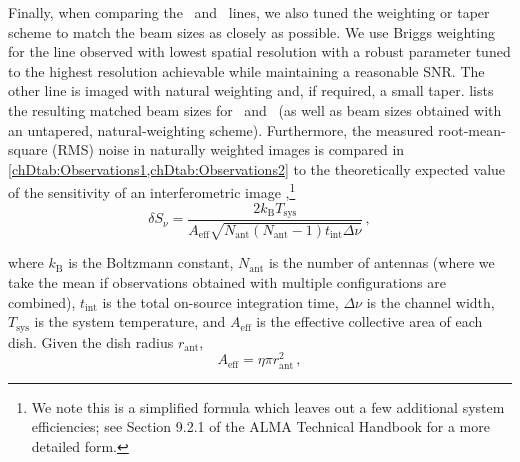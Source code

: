 Finally, when comparing the \CII\ and \OIIIf\ lines, we also tuned the weighting or taper scheme to match the beam sizes as closely as possible. We use Briggs weighting for the line observed with lowest spatial resolution with a robust parameter tuned to the highest resolution achievable while maintaining a reasonable SNR. The other line is imaged with natural weighting and, if required, a small taper.  lists the resulting matched beam sizes for \CII\ and \OIIIf\ (as well as beam sizes obtained with an untapered, natural-weighting scheme). Furthermore, the measured root-mean-square (RMS) noise in naturally weighted images is compared in \cref{chDtab:Observations1,chDtab:Observations2} to the theoretically expected value of the sensitivity of an interferometric image \citep{2017isra.book.....T},\footnote{We note this is a simplified formula which leaves out a few additional system efficiencies; see Section 9.2.1 of the ALMA Technical Handbook \citep{ALMA_technical_handbook} for a more detailed form.}
\begin{equation}
    \label{chDeq:Interferometry_sensitivity}
    \delta S_\nu = \frac{2 k_\text{B} T_\text{sys}}{A_\text{eff} \sqrt{N_\text{ant} (N_\text{ant} - 1) t_\text{int} \Delta \nu}} \, ,
\end{equation}

\noindent where $k_\text{B}$ is the Boltzmann constant, $N_\text{ant}$ is the number of antennas (where we take the mean if observations obtained with multiple configurations are combined), $t_\text{int}$ is the total on-source integration time, $\Delta \nu$ is the channel width, $T_\text{sys}$ is the system temperature, and $A_\text{eff}$ is the effective collective area of each dish. Given the dish radius $r_\text{ant}$,
\begin{equation*}
    A_\text{eff} = \eta \pi r_\text{ant}^2 \, ,
\end{equation*}

